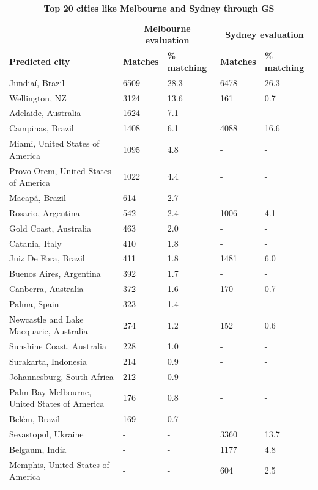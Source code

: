 \documentclass[10pt,letterpaper,hidelinks]{article}
\begin{document}
\begin{table}[!htbp]
\begin{adjustwidth}{-2.25in}{0in}
\caption{\bf Top 20 cities like Melbourne and Sydney through GS \label{tab:melbournesydneyGS}}     
\begin{tabular}{ l  l l l  l}
 \hline    &  \multicolumn{2}{c}{\textbf{Melbourne evaluation}} & \multicolumn{2}{c}{\textbf{Sydney evaluation}}  \\  
\textbf{Predicted city} & \textbf{Matches} & \textbf{\% matching}  & \textbf{Matches} & \textbf{\% matching}\\ \hline
Jundia\'{i}, Brazil & 6509 & 28.3 & 6478 & 26.3 \\ 
Wellington, NZ & 3124 & 13.6 & 161 & 0.7 \\ 
Adelaide, Australia & 1624 & 7.1 &-&- \\ 
Campinas, Brazil & 1408 & 6.1 & 4088 & 16.6 \\ 
Miami, United States of America & 1095 & 4.8 &-&- \\ 
Provo-Orem, United States of America & 1022 & 4.4 &-&- \\ 
Macap\'{a}, Brazil & 614 & 2.7 &-&- \\ 
Rosario, Argentina & 542 & 2.4 & 1006 & 4.1 \\ 
Gold Coast, Australia & 463 & 2.0 &-&- \\ 
Catania, Italy & 410 & 1.8 &-&- \\ 
Juiz De Fora, Brazil & 411 & 1.8 & 1481 & 6.0 \\ 
Buenos Aires, Argentina & 392 & 1.7 &-&- \\ 
Canberra, Australia & 372 & 1.6 & 170 & 0.7 \\ 
Palma, Spain & 323 & 1.4 &-&- \\ 
Newcastle and Lake Macquarie, Australia & 274 & 1.2 & 152 & 0.6 \\ 
Sunshine Coast, Australia & 228 & 1.0 &-&- \\ 
Surakarta, Indonesia & 214 & 0.9 &-&- \\ 
Johannesburg, South Africa & 212 & 0.9 &-&- \\ 
Palm Bay-Melbourne, United States of America & 176 & 0.8 &-&- \\ 
Bel\'{e}m, Brazil & 169 & 0.7 &-&- \\ 
Sevastopol, Ukraine &-&- & 3360 & 13.7\\ 
Belgaum, India &-&- & 1177 & 4.8\\ 
Memphis, United States of America &-&- & 604 & 2.5\\ 

\end{tabular}
\end{adjustwidth}
\end{table}
\end{document}
